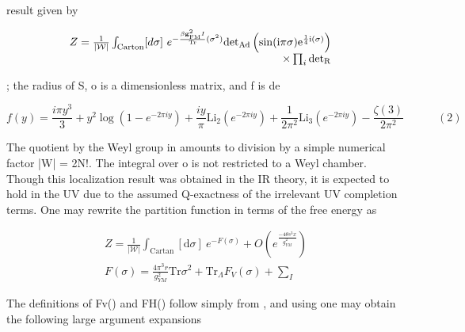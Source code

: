 \documentclass{article}
\begin{document}
\sloppy

result given by


\begin{equation}
\begin{array} { r l } { Z = \frac { 1 } { | \mathcal { W } | } \int _ { \mathrm { C a r t o n } } [ d \sigma ] ~ e ^ { - \frac { \beta \mathbf { g } _ { \mathrm { F M } } ^ { 2 } I } { \mathrm { T r } } ( \sigma ^ { 2 } ) } \mathrm { d e t } _ { \mathrm { A d } } \left ( \sin ( \mathrm { i } \pi \sigma ) \mathrm { e } ^ { \frac { 1 } { 4 } \mathrm { i } ( \sigma ) } \right ) } & { } \\ { \times \prod _ { i } \mathrm { d e t } _ { \mathrm { R}}}\end{array}
\end{equation}


; the radius of S, o is a dimensionless matrix, and f is de


\begin{equation}
f ( y ) = { \frac { i \pi y ^ { 3 } } { 3 } } + y ^ { 2 } \log \left ( 1 - e ^ { - 2 \pi i y } \right ) + { \frac { i y } { \pi } } \mathrm { L i } _ { 2 } \left ( e ^ { - 2 \pi i y } \right ) + { \frac { 1 } { 2 \pi ^ { 2 } } } \mathrm { L i } _ { 3 } \left ( e ^ { - 2 \pi i y } \right ) - { \frac { \zeta ( 3 ) } { 2 \pi ^ { 2 } } } \qquad \quad ( 2 )
\end{equation}


The quotient by the Weyl group in amounts to division by a simple numerical factor |W| =
2N!. The integral over o is not restricted to a Weyl chamber. Though this localization
result was obtained in the IR theory, it is expected to hold in the UV due to the assumed
Q-exactness of the irrelevant UV completion terms. One may rewrite the partition function
in terms of the free energy as


\begin{equation}
\begin{array} { c } { Z = \frac { 1 } { | \mathcal { W } | } \int _ { \mathrm { C a r t a n } } [ \mathrm { d } \sigma ] ~ e ^ { - F ( \sigma ) } + O \left ( e ^ { \frac { - 4 \theta s ^ { 3 } x } { g _ { Y M } ^ { 2 } } } \right ) } \\ { F ( \sigma ) = \frac { 4 \pi ^ { 3 } r } { g _ { Y M } ^ { 2 } } \mathrm { T r } \sigma ^ { 2 } + \mathrm { T r } _ { \Lambda } F _ { V } ( \sigma ) + \sum _ { I } \mathrm {}}\end{array}
\end{equation}


The definitions of Fv() and FH() follow simply from , and using one may obtain the
following large argument expansions
\end{document}
